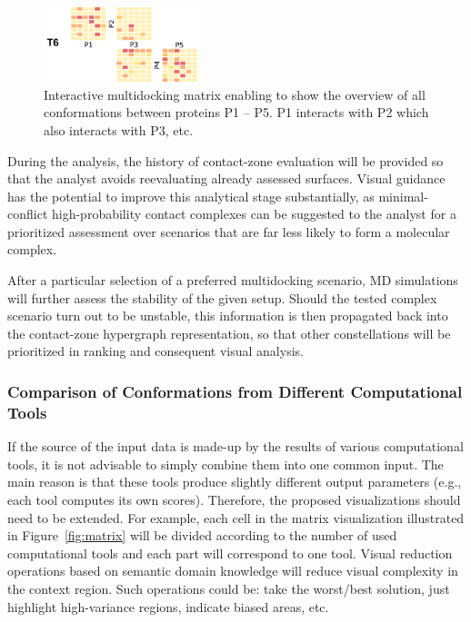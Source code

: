 \documentclass[11pt,a4paper,titlepage,oneside,onecolumn]{article}
\begin{document}

\setlength\intextsep{0pt}
\begin{figure}
\vspace{-5mm}
  \begin{center}
    \includegraphics[width=0.4\textwidth]{pics/multidock2.png}
  \end{center}
\vspace{-5mm}
  \caption{Interactive multidocking matrix enabling to show the overview of all conformations between proteins P1 -- P5. P1 interacts with P2 which also interacts with P3, etc.}
  \label{fig:multidock2}
\end{figure}

During the analysis, the history of contact-zone evaluation will be provided so that the analyst avoids reevaluating already assessed surfaces. 
Visual guidance has the potential to improve this analytical stage substantially, as minimal-conflict high-probability contact complexes can be suggested to the analyst for a prioritized assessment over scenarios that are far less likely to form a molecular complex.

After a particular selection of a preferred multidocking scenario, MD simulations will further assess the stability of the given setup. 
Should the tested complex scenario turn out to be unstable, this information is then propagated back into the contact-zone hypergraph representation, so that other constellations will be prioritized in ranking and consequent visual analysis.

\subsubsection{Comparison of Conformations from Different Computational Tools}
\vspace{-4mm}
If the source of the input data is made-up by the results of various computational tools, it is not advisable to simply combine them into one common input.
The main reason is that these tools produce slightly different output parameters (e.g., each tool computes its own scores). 
Therefore, the proposed visualizations should need to be extended. 
For example, each cell in the matrix visualization illustrated in Figure~\ref{fig:matrix} will be divided according to the number of used computational tools and each part will correspond to one tool.
Visual reduction operations based on semantic domain knowledge will reduce visual complexity in the context region.
Such operations could be: take the worst/best solution, just highlight high-variance regions, indicate biased areas, etc.
\end{document}
